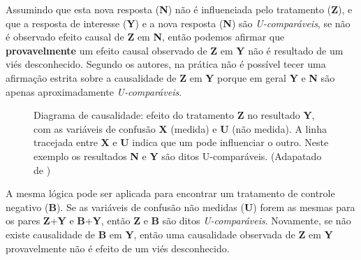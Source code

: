 \documentclass[final,5p]{elsarticle}
\numberwithin{equation}{section}
\begin{document}
    Assumindo que esta nova resposta (\textbf{N}) não é influenciada pelo tratamento (\textbf{Z}), e que a resposta de interesse (\textbf{Y}) e a nova resposta (\textbf{N}) são \textit{U-comparáveis}, se não é observado efeito causal de \textbf{Z} em \textbf{N}, então podemos afirmar que \textbf{provavelmente} um efeito causal observado de \textbf{Z} em \textbf{Y} não é resultado de um viés desconhecido. Segundo os autores, na prática não é possível tecer uma afirmação estrita sobre a causalidade de \textbf{Z} em \textbf{Y} porque em geral \textbf{Y} e \textbf{N} são apenas aproximadamente \textit{U-comparáveis}.

    \begin{figure}[hbt!]
        \centering
        \caption{Diagrama de causalidade: efeito do tratamento \textbf{Z} no resultado \textbf{Y}, com as variáveis de confusão \textbf{X} (medida) e \textbf{U} (não medida). A linha tracejada entre \textbf{X} e \textbf{U} indica que um pode influenciar o outro. Neste exemplo os resultados \textbf{N} e \textbf{Y} são ditos U-comparáveis. (Adapatado de \cite{lipsitch2010negative})}
        \label{fig:diagrama_confusao}
    \end{figure}

    A mesma lógica pode ser aplicada para encontrar um tratamento de controle negativo (\textbf{B}). Se as variáveis de confusão não medidas (\textbf{U}) forem as mesmas para os pares \textbf{Z}+\textbf{Y} e \textbf{B}+\textbf{Y}, então \textbf{Z} e \textbf{B} são ditos \textit{U-comparáveis}. Novamente, se não existe causalidade de \textbf{B} em \textbf{Y}, então uma causalidade observada de \textbf{Z} em \textbf{Y} provavelmente não é efeito de um viés desconhecido.
\end{document}
